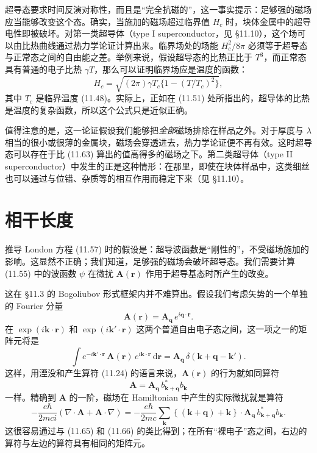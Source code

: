 超导态要求时间反演对称性，而且是“完全抗磁的”，这一事实提示：足够强的磁场应当能够改变这个态。确实，当施加的磁场超过临界值 $H_c$ 时，块体金属中的超导电性即被破坏。对第一类超导体（type I superconductor，见 §11.10），这个场可以由比热曲线通过热力学论证计算出来。临界场处的场能 $H_c^{2}/8\pi$ 必须等于超导态与正常态之间的自由能之差。举例来说，假设超导态的比热正比于 $T^{3}$，而正常态具有普通的电子比热 $\gamma T$，那么可以证明临界场应是温度的函数：
\begin{equation*}
H_c = \sqrt{(2\pi)\gamma T_c\{1-(T/T_c)^{2}\}}, \tag{11.63}
\end{equation*}
其中 $T_c$ 是临界温度 (11.48)。实际上，正如在 (11.51) 处所指出的，超导体的比热是温度的复杂函数，所以这个公式只是近似正确。

值得注意的是，这一论证假设我们能够把\emph{全部}磁场排除在样品之外。对于厚度与 $\lambda$ 相当的很小或很薄的金属块，磁场会穿透进去，热力学论证便不再有效。这时超导态可以存在于比 (11.63) 算出的值高得多的磁场之下。第二类超导体（type II superconductor）中发生的正是这种情形：在那里，即使在块体样品中，这类细丝也可以通过与位错、杂质等的相互作用而稳定下来（见 §11.10）。

\section{相干长度}

推导 London 方程 (11.57) 时的假设是：超导波函数是“刚性的”，不受磁场施加的影响。这显然不正确；我们知道，足够强的磁场会破坏超导态。我们需要计算 (11.55) 中的波函数 $\psi$ 在微扰 $\mathbf{A}(\mathbf{r})$ 作用于超导基态时所产生的改变。

这在 §11.3 的 Bogoliubov 形式框架内并不难算出。假设我们考虑矢势的一个单独的 Fourier 分量
\begin{equation*}
\mathbf{A}(\mathbf{r}) = \mathbf{A}_{\mathbf{q}}\,e^{i\mathbf{q}\cdot\mathbf{r}}. \tag{11.64}
\end{equation*}
在 $\exp(i\mathbf{k}\cdot\mathbf{r})$ 和 $\exp(i\mathbf{k}'\cdot\mathbf{r})$ 这两个普通自由电子态之间，这一项之一的矩阵元将是
\begin{equation*}
\int e^{-i\mathbf{k}'\cdot\mathbf{r}}\,\mathbf{A}(\mathbf{r})\,e^{i\mathbf{k}\cdot\mathbf{r}}\,\mathrm{d}\mathbf{r} = \mathbf{A}_{\mathbf{q}}\,\delta(\mathbf{k}+\mathbf{q}-\mathbf{k}'). \tag{11.65}
\end{equation*}
这样，用湮没和产生算符 (11.24) 的语言来说，$\mathbf{A}(\mathbf{r})$ 的行为就如同算符
\begin{equation*}
\mathbf{A} = \mathbf{A}_{\mathbf{q}}\,b_{\mathbf{k}+\mathbf{q}}^{*}b_{\mathbf{k}} \tag{11.66}
\end{equation*}
一样。精确到 $\mathbf{A}$ 的一阶，磁场在 Hamiltonian 中产生的实际微扰就是算符
\begin{equation*}
-\frac{e\hbar}{2mci}\left(\nabla\cdot\mathbf{A}+\mathbf{A}\cdot\nabla\right) = -\frac{e\hbar}{2mc}\sum_{\mathbf{k}}\left\{(\mathbf{k}+\mathbf{q})+\mathbf{k}\right\}\cdot\mathbf{A}_{\mathbf{q}}\,b_{\mathbf{k}+\mathbf{q}}^{*}b_{\mathbf{k}}. \tag{11.67}
\end{equation*}
这很容易通过与 (11.65) 和 (11.66) 的类比得到；在所有“裸电子”态之间，右边的算符与左边的算符具有相同的矩阵元。

